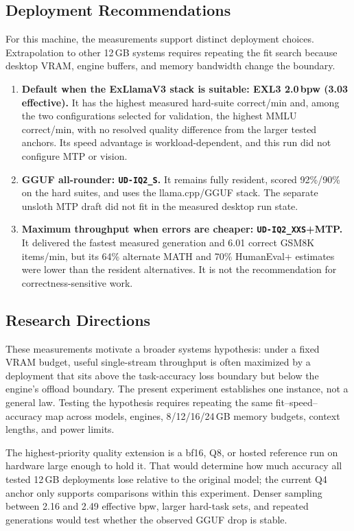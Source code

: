 \documentclass[11pt]{article}
\newcommand{\q}[1]{\texttt{#1}}
\begin{document}
\subsection{Deployment Recommendations}

For this machine, the measurements support distinct deployment choices.
Extrapolation to
other 12\,GB systems requires repeating the fit search because desktop VRAM,
engine buffers, and memory bandwidth change the boundary.

\begin{enumerate}
  \item \textbf{Default when the ExLlamaV3 stack is suitable: EXL3
  2.0\,bpw (3.03 effective).} It has the highest measured hard-suite
  correct/min and, among the two configurations selected for validation, the highest MMLU
  correct/min, with no resolved quality difference from the larger tested
  anchors. Its speed advantage is workload-dependent, and this run did not
  configure MTP or vision.
  \item \textbf{GGUF all-rounder: \q{UD-IQ2\_S}.} It remains fully resident,
  scored 92\%/90\% on the hard suites, and uses the llama.cpp/GGUF stack. The
  separate unsloth MTP draft did not fit in the measured desktop run state.
  \item \textbf{Maximum throughput when errors are cheaper:
  \q{UD-IQ2\_XXS}+MTP.} It delivered the fastest measured generation and
  6.01 correct GSM8K items/min, but its 64\% alternate MATH and 70\%
  HumanEval+ estimates were lower than the resident alternatives. It is not
  the recommendation for correctness-sensitive work.
\end{enumerate}


\subsection{Research Directions}

These measurements motivate a broader systems hypothesis: under a fixed VRAM
budget, useful single-stream throughput is often maximized by a deployment
that sits above the task-accuracy loss boundary but below the engine's
offload boundary. The present experiment establishes one instance, not a
general law. Testing the hypothesis requires repeating the same fit--speed--
accuracy map across models, engines, 8/12/16/24\,GB memory budgets, context
lengths, and power limits.

The highest-priority quality extension is a bf16, Q8, or hosted reference run
on hardware large enough to hold it. That would determine how much accuracy
all tested 12\,GB deployments lose relative to the original model; the current
Q4 anchor only supports comparisons within this experiment. Denser sampling
between 2.16 and 2.49 effective bpw, larger hard-task sets, and repeated
generations would test whether the observed GGUF drop is stable.
\end{document}
